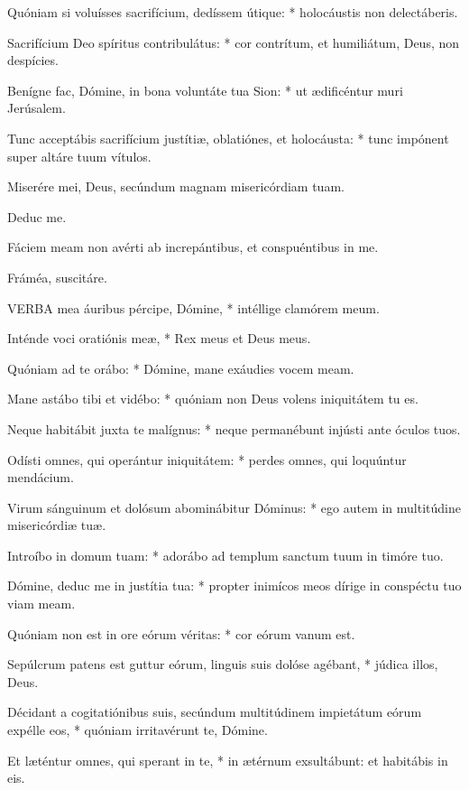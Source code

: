 Quóniam si voluísses sacrifícium, dedíssem útique: * holocáustis non delectáberis.

Sacrifícium Deo spíritus contribulátus: * cor contrítum, et humiliátum, Deus, non despícies.

Benígne fac, Dómine, in bona voluntáte tua Sion: * ut ædificéntur muri Jerúsalem.

Tunc acceptábis sacrifícium justítiæ, oblatiónes, et holocáusta: * tunc impónent super altáre tuum vítulos.

 Miserére mei, Deus, secúndum magnam misericórdiam tuam.

 Deduc me.


 Fáciem meam non avérti ab increpántibus, et conspuéntibus in me.

 Fráméa, suscitáre.


\lettrine[lines=2]{V}{ERBA} mea áuribus pércipe, Dómine, * intéllige clamórem meum.

Inténde voci oratiónis meæ, * Rex meus et Deus meus.

Quóniam ad te orábo: * Dómine, mane exáudies vocem meam.

Mane astábo tibi et vidébo: * quóniam non Deus volens iniquitátem tu es.

Neque habitábit juxta te malígnus: * neque permanébunt injústi ante óculos tuos.

Odísti omnes, qui operántur iniquitátem: * perdes omnes, qui loquúntur mendácium.

Virum sánguinum et dolósum abominábitur Dóminus: * ego autem in multitúdine misericórdiæ tuæ.

Introíbo in domum tuam: * adorábo ad templum sanctum tuum in timóre tuo.

Dómine, deduc me in justítia tua: * propter inimícos meos dírige in conspéctu tuo viam meam.

Quóniam non est in ore eórum véritas: * cor eórum vanum est.

Sepúlcrum patens est guttur eórum, linguis suis dolóse agébant, * júdica illos, Deus.

Décidant a cogitatiónibus suis, secúndum multitúdinem impietátum eórum expélle eos, * quóniam irritavérunt te, Dómine.

Et læténtur omnes, qui sperant in te, * in ætérnum exsultábunt: et habitábis in eis.

